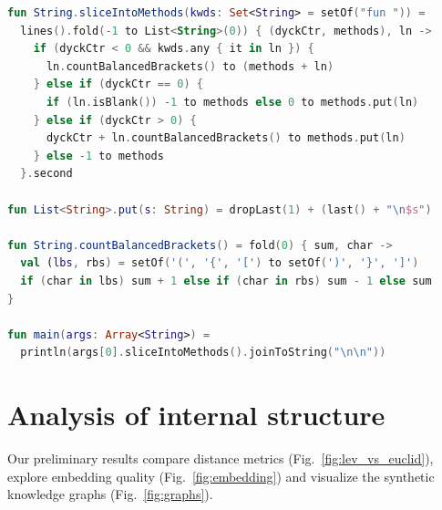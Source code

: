 \documentclass[sigconf,review,anonymous]{acmart}
\begin{document}
  \vspace{11pt}

  \begin{lstlisting}[basicstyle=\scriptsize\ttfamily, language=kotlin,label={lst:lstlisting}]
fun String.sliceIntoMethods(kwds: Set<String> = setOf("fun ")) =
  lines().fold(-1 to List<String>(0)) { (dyckCtr, methods), ln ->
    if (dyckCtr < 0 && kwds.any { it in ln }) {
      ln.countBalancedBrackets() to (methods + ln)
    } else if (dyckCtr == 0) {
      if (ln.isBlank()) -1 to methods else 0 to methods.put(ln)
    } else if (dyckCtr > 0) {
      dyckCtr + ln.countBalancedBrackets() to methods.put(ln)
    } else -1 to methods
  }.second

fun List<String>.put(s: String) = dropLast(1) + (last() + "\n$s")

fun String.countBalancedBrackets() = fold(0) { sum, char ->
  val (lbs, rbs) = setOf('(', '{', '[') to setOf(')', '}', ']')
  if (char in lbs) sum + 1 else if (char in rbs) sum - 1 else sum
}

fun main(args: Array<String>) =
  println(args[0].sliceIntoMethods().joinToString("\n\n"))
  \end{lstlisting}

  \section{Analysis of internal structure}

  Our preliminary results compare distance metrics (Fig.~\ref{fig:lev_vs_euclid}), explore embedding quality (Fig.~\ref{fig:embedding}) and visualize the synthetic knowledge graphs (Fig.~\ref{fig:graphs}).
\end{document}
